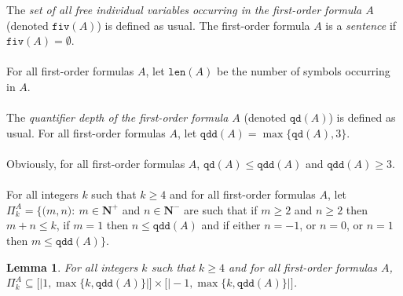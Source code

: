 \documentclass[draft]{article}
\newtheorem{lemma}{Lemma}
\def\lsem{{\lbrack\mid}}
\def\rsem{{\mid\rbrack}}
\def\qd{\mathtt{qd}}
\def\qdd{\mathtt{qdd}}
\def\size{\mathtt{len}}
\def\fiv{\mathtt{fiv}}
\def\qd{\mathtt{qd}}
\begin{document}
%
%
The {\it set of all free individual variables occurring in the first-order formula $A$}\/ (denoted $\fiv(A)$) is defined as usual.
The first-order formula $A$ is a {\it sentence}\/ if $\fiv(A){=}\emptyset$.
%
%
\\
\\
%
%
For all first-order formulas $A$, let $\size(A)$ be the number of symbols occurring in $A$.
%
%
\\
\\
%
%
The {\it quantifier depth of the first-order formula $A$}\/ (denoted $\qd(A)$) is defined as usual.
For all first-order formulas $A$, let $\qdd(A){=}\max\{\qd(A),3\}$.
%
%
\\
\\
%
%
Obviously, for all first-order formulas $A$, $\qd(A){\leq}\qdd(A)$ and $\qdd(A){\geq}3$.
%
%
\\
\\
%
%
For all integers $k$ such that $k{\geq}4$ and for all first-order formulas $A$, let $\Pi_{k}^{A}{=}\{(m,
%
%
%
%
%
%
%
%
%
%
%
%
$\linebreak$
%
%
%
%
%
%
%
%
%
%
%
%
n):\ m{\in}\mathbf{N}^{+}$ and $n{\in}\mathbf{N}^{-}$ are such that if $m{\geq}2$ and $n{\geq}2$ then $m{+}n{\leq}k$, if $m{=}1$ then $n{\leq}\qdd(A)$ and if either $n{=}{-}1$, or $n{=}0$, or $n{=}1$ then $m{\leq}\qdd(A)\}$.
%
%
\begin{lemma}\label{lemma:ll:finitely:many:PI:PI:pairs}
%
%
For all integers $k$ such that $k{\geq}4$ and for all first-order formulas $A$, $\Pi_{k}^{A}{\subseteq}\lsem1,\max\{k,\qdd(A)\}\rsem{\times}\lsem{-}1,\max\{k,\qdd(A)\}\rsem$.
%
%
\end{lemma}
%
%
%
%
\end{document}
